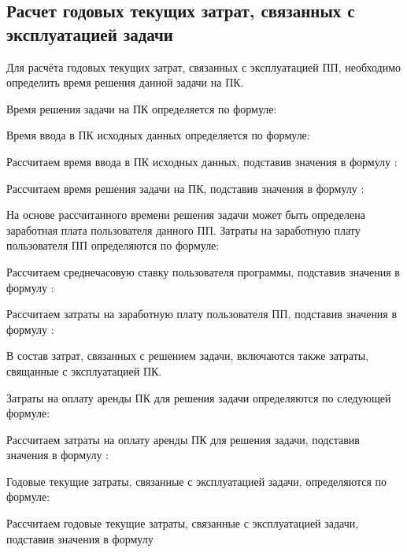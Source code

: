 \subsection{Расчет годовых текущих затрат, связанных с эксплуатацией задачи}
\label{sec:economics:manualTotalExpenses}

Для расчёта годовых текущих затрат, связанных с эксплуатацией ПП, необходимо определить время решения данной задачи на ПК.

Время решения задачи на ПК определяется по формуле:
\pcTaskAccomplishTimeCostEquation

Время ввода в ПК исходных данных определяется по формуле:
\manualInputTimeEquation

Рассчитаем время ввода в ПК исходных данных, подставив значения в формулу :
\manualInputTimeFormulaApplied

Рассчитаем время решения задачи на ПК, подставив значения в формулу :
\pcTaskAccomplishTimeCostFormulaApplied

На основе рассчитанного времени решения задачи может быть определена заработная плата пользователя данного ПП. Затраты на заработную плату пользователя ПП определяются по формуле:
\userSalaryEquation

Рассчитаем среднечасовую ставку пользователя программы, подставив значения в формулу :
\userRateFormulaApplied

Рассчитаем затраты на заработную плату пользователя ПП, подставив значения в формулу :
\userSalaryFormulaApplied

В состав затрат, связанных с решением задачи, включаются также затраты, свящанные с эксплуатацией ПК.

Затраты на оплату аренды ПК для решения задачи определяются по следующей формуле:
\userPCRentCostEquation

Рассчитаем затраты на оплату аренды ПК для решения задачи, подставив значения в формулу :
\userPCRentCostFormulaApplied

Годовые текущие затраты, связанные с эксплуатацией задачи, определяются по формуле:
\annualExpensesEquation

Рассчитаем годовые текущие затраты, связанные с эксплуатацией задачи, подставив значения в формулу 
\annualExpensesFormulaApplied